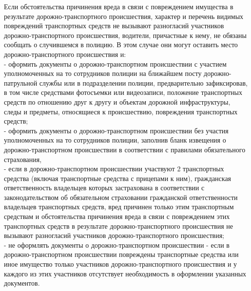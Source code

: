 \documentclass[russian,english,12pt,a4paper,reqno,dviphfm,oneside]{book}
\begin{document}
{Если обстоятельства причинения вреда в связи с повреждением имущества в результате дорожно-транспортного происшествия, характер и перечень видимых повреждений транспортных средств не вызывают разногласий участников дорожно-транспортного происшествия, водители, причастные к нему, не обязаны сообщать о случившемся в полицию. В этом случае они могут оставить место дорожно-транспортного происшествия и:\\
- оформить документы о дорожно-транспортном происшествии с участием уполномоченных на то сотрудников полиции на ближайшем посту дорожно-патрульной службы или в подразделении полиции, предварительно зафиксировав, в том числе средствами фотосъемки или видеозаписи, положение транспортных средств по отношению друг к другу и объектам дорожной инфраструктуры, следы и предметы, относящиеся к происшествию, повреждения транспортных средств;\\ 
- оформить документы о дорожно-транспортном происшествии без участия уполномоченных на то сотрудников полиции, заполнив бланк извещения о дорожно-транспортном происшествии в соответствии с правилами обязательного страхования,\\ - если в дорожно-транспортном происшествии участвуют 2 транспортных средства (включая транспортные средства с прицепами к ним), гражданская ответственность владельцев которых застрахована в соответствии с законодательством об обязательном страховании гражданской ответственности владельцев транспортных средств, вред причинен только этим транспортным средствам и обстоятельства причинения вреда в связи с повреждением этих транспортных средств в результате дорожно-транспортного происшествия не вызывают разногласий участников дорожно-транспортного происшествия;\\
- не оформлять документы о дорожно-транспортном происшествии - если в дорожно-транспортном происшествии повреждены транспортные средства или иное имущество только участников дорожно-транспортного происшествия и у каждого из этих участников отсутствует необходимость в оформлении указанных документов.\\

}
\end{document}
